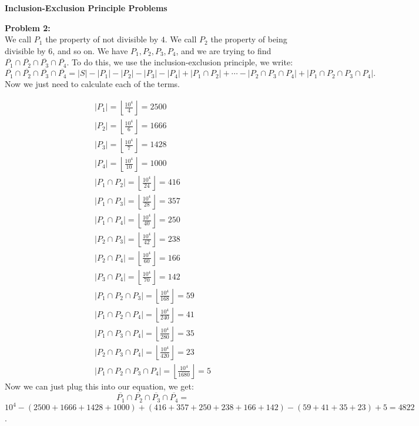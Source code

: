 \documentclass[12pt]{article}
\begin{document}
\begin{center}
	\LARGE	
	\textbf{Inclusion-Exclusion Principle Problems}
\end{center}

\noindent
\textbf{Problem 2:}\\

\noindent
We call $P_1$ the property of not divisible by $4$. We call $P_2$ the property of being divisible
by 6, and so on. We have $P_1,P_2,P_3,P_4$, and we are trying to find 
$\overline{P_1} \cap \overline{P_2} \cap \overline{P_3} \cap \overline{P_4}$.
To do this, we use the inclusion-exclusion principle, we write:
\[
\overline{P_1} \cap \overline{P_2} \cap \overline{P_3} \cap \overline{P_4}
= 
|S|-|P_1|-|P_2|-|P_3|-|P_4|+|P_1\cap P_2|+\cdots-|P_2\cap P_3\cap P_4|+|P_1 \cap P_2 \cap P_3 \cap P_4| 
.\] 
Now we just need to calculate each of the terms.

\begin{align}
	\left|P_1\right| = \left\lfloor \frac{10^4}{4}\right\rfloor = 2500\\
	|P_2| = \left\lfloor \frac{10^4}{6}\right\rfloor = 1666\\
	|P_3| = \left\lfloor \frac{10^4}{7}\right\rfloor = 1428\\
	|P_4| = \left\lfloor \frac{10^4}{10}\right\rfloor = 1000\\
	|P_1\cap P_2| = \left\lfloor \frac{10^4}{24} \right\rfloor = 416\\	
	|P_1\cap P_3| = \left\lfloor \frac{10^4}{28} \right\rfloor = 357\\
	|P_1\cap P_4| = \left\lfloor \frac{10^4}{40} \right\rfloor = 250 \\
	|P_2\cap P_3| = \left\lfloor \frac{10^4}{42} \right\rfloor = 238 \\
	|P_2\cap P_4| = \left\lfloor \frac{10^4}{60} \right\rfloor = 166 \\
	|P_3\cap P_4| = \left\lfloor \frac{10^4}{70} \right\rfloor = 142 \\
	|P_1\cap P_2\cap P_3| = \left\lfloor \frac{10^4}{168} \right\rfloor = 59 \\
	|P_1\cap P_2 \cap P_4| = \left\lfloor \frac{10^4}{240} \right\rfloor = 41 \\
	|P_1\cap P_3 \cap P_4| = \left\lfloor \frac{10^4}{280} \right\rfloor = 35 \\
	|P_2\cap P_3 \cap P_4| = \left\lfloor \frac{10^4}{420} \right\rfloor = 23 \\
	|P_1 \cap P_2 \cap P_3 \cap P_4| = \left\lfloor \frac{10^4}{1680} \right\rfloor = 5
\end{align}
Now we can just plug this into our equation, we get:
\[
\overline{P_1} \cap \overline{P_2} \cap \overline{P_3} \cap \overline{P_4} = 
\]
\[
10^{4}-(2500+1666+1428+1000)+(416+357+250+238+166+142)-(59+41+35+23)+5 = 4822
\].\\
\end{document}

